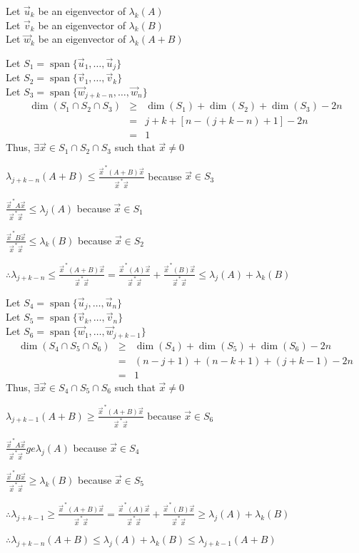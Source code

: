 \documentclass[letterpaper,12pt,fleqn]{article}
\newcommand{\vx}{\vec{x}}
\newcommand{\vxct}{\vx^{\,*}}
\newcommand{\vu}{\vec{u}}
\newcommand{\vv}{\vec{v}}
\newcommand{\vw}{\vec{w}}
\renewcommand{\l}{\lambda}
\DeclareMathOperator{\spn}{span}
\begin{document}
\begin{theproof}
  Let $\vu_k$ be an eigenvector of $\l_k(A)$ \\
  Let $\vv_k$ be an eigenvector of $\l_k(B)$ \\
  Let $\vw_k$ be an eigenvector of $\l_k(A+B)$

  Let $S_1=\spn\{\vu_1,\ldots,\vu_j\}$ \\
  Let $S_2=\spn\{\vv_1,\ldots,\vv_k\}$ \\
  Let $S_3=\spn\{\vw_{j+k-n},\ldots,\vw_n\}$
  \begin{eqnarray*}
    \dim(S_1\cap S_2\cap S_3) &\ge& \dim(S_1)+\dim(S_2)+\dim(S_3)-2n \\
    &=& j+k+[n-(j+k-n)+1]-2n \\
    &=& 1
  \end{eqnarray*}
  Thus, $\exists\vx\in S_1\cap S_2\cap S_3$ such that $\vx\ne 0$

  $\l_{j+k-n}(A+B)\le\frac{\vxct(A+B)\vx}{\vxct\vx}$ because $\vx\in S_3$
  
  $\frac{\vxct A\vx}{\vxct\vx}\le\l_j(A)$ because $\vx\in S_1$
  
  $\frac{\vxct B\vx}{\vxct\vx}\le\l_k(B)$ because $\vx\in S_2$

  $\therefore\l_{j+k-n}\le\frac{\vxct(A+B)\vx}{\vxct\vx}=
  \frac{\vxct(A)\vx}{\vxct\vx}+\frac{\vxct(B)\vx}{\vxct\vx}\le\l_j(A)+\l_k(B)$

  \bigskip

  Let $S_4=\spn\{\vu_j,\ldots,\vu_n\}$ \\
  Let $S_5=\spn\{\vv_k,\ldots,\vv_n\}$ \\
  Let $S_6=\spn\{\vw_1,\ldots,\vw_{j+k-1}\}$ \\
  \begin{eqnarray*}
    \dim(S_4\cap S_5\cap S_6) &\ge& \dim(S_4)+\dim(S_5)+\dim(S_6)-2n \\
    &=& (n-j+1)+(n-k+1)+(j+k-1)-2n \\
    &=& 1
  \end{eqnarray*}
  Thus, $\exists\vx\in S_4\cap S_5\cap S_6$ such that $\vx\ne 0$

  $\l_{j+k-1}(A+B)\ge\frac{\vxct(A+B)\vx}{\vxct\vx}$ because $\vx\in S_6$

  $\frac{\vxct A\vx}{\vxct\vx}ge\l_j(A)$ because $\vx\in S_4$
  
  $\frac{\vxct B\vx}{\vxct\vx}\ge\l_k(B)$ because $\vx\in S_5$

  $\therefore\l_{j+k-1}\ge\frac{\vxct(A+B)\vx}{\vxct\vx}=
  \frac{\vxct(A)\vx}{\vxct\vx}+\frac{\vxct(B)\vx}{\vxct\vx}\ge\l_j(A)+\l_k(B)$

  $\therefore\l_{j+k-n}(A+B)\le\l_j(A)+\l_k(B)\le\l_{j+k-1}(A+B)$
\end{theproof}
\end{document}
